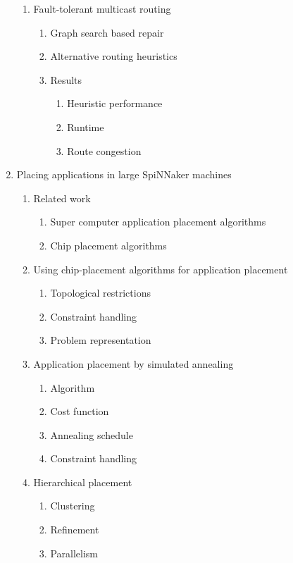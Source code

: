 \begin{enumerate}
\begin{enumerate}
		\item Fault-tolerant multicast routing
		\begin{enumerate}
			\item Graph search based repair
			\item Alternative routing heuristics
			\item Results
			\begin{enumerate}
				\item Heuristic performance
				\item Runtime
				\item Route congestion
			\end{enumerate}
		\end{enumerate}
	\end{enumerate}
	
	\item Placing applications in large SpiNNaker machines
	\begin{enumerate}
		\item Related work
		\begin{enumerate}
			\item Super computer application placement algorithms
			\item Chip placement algorithms
		\end{enumerate}
		
		\item Using chip-placement algorithms for application placement
		\begin{enumerate}
			\item Topological restrictions
			\item Constraint handling
			\item Problem representation
		\end{enumerate}
		
		\item Application placement by simulated annealing
		\begin{enumerate}
			\item Algorithm
			\item Cost function
			\item Annealing schedule
			\item Constraint handling
		\end{enumerate}
		
		\item Hierarchical placement
		\begin{enumerate}
			\item Clustering
			\item Refinement
			\item Parallelism
		\end{enumerate}
		

\end{enumerate}
\end{enumerate}
